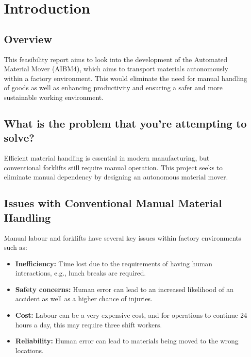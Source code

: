 \documentclass[12pt]{article}
\begin{document}
\tableofcontents

\newpage



\section{Introduction}
\subsection{Overview}
This feasibility report aims to look into the development of the Automated Material Mover (AIBM4), which aims to transport materials autonomously within a factory environment. This would eliminate the need for manual handling of goods as well as enhancing productivity and ensuring a safer and more sustainable working environment.
\subsection{What is the problem that you’re attempting to solve?}
Efficient material handling is essential in modern manufacturing, but conventional forklifts still require manual operation. This project seeks to eliminate manual dependency by designing an autonomous material mover.
 
\subsection{Issues with Conventional Manual Material Handling}

Manual labour and forklifts have several key issues within factory environments such as:

\begin{itemize}
    \item \textbf{Inefficiency:} Time lost due to the requirements of having human interactions, e.g., lunch breaks are required.
    \item \textbf{Safety concerns:} Human error can lead to an increased likelihood of an accident as well as a higher chance of injuries.
    \item \textbf{Cost:} Labour can be a very expensive cost, and for operations to continue 24 hours a day, this may require three shift workers.
    \item \textbf{Reliability:} Human error can lead to materials being moved to the wrong locations.
\end{itemize}
\end{document}
